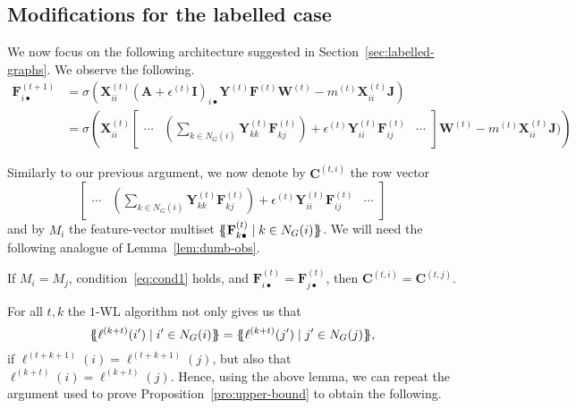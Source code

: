 \subsection{Modifications for the labelled case}
We now focus on the following architecture suggested
in Section~\ref{sec:labelled-graphs}. We observe the following.
\begin{align}
    \mathbf{F}^{(t+1)}_{i\bullet} &= \sigma(
        \mathbf{X}^{(t)}_{ii} (\mathbf{A} + \epsilon^{(t)}\mathbf{I})_{i\bullet}
        \mathbf{Y}^{(t)}\mathbf{F}^{(t)}\mathbf{W}^{(t)}
        -m^{(t)}\mathbf{X}_{ii}^{(t)}\mathbf{J})\\
    &= \sigma \left(
        \mathbf{X}^{(t)}_{ii}
        \begin{bmatrix}
        \cdots & \left(\sum_{k \in N_G(i)} \mathbf{Y}^{(t)}_{kk} \mathbf{F}^{(t)}_{k j}\right) + \epsilon^{(t)}\mathbf{Y}^{(t)}_{ii}\mathbf{F}^{(t)}_{ij} & \cdots
        \end{bmatrix}
        \mathbf{W}^{(t)}
        -m^{(t)}\mathbf{X}_{ii}^{(t)}\mathbf{J})
        \right)
\end{align}

Similarly to our previous argument, we now
denote by $\mathbf{C}^{(t,i)}$ the row vector 
\[
    \begin{bmatrix}
        \cdots & \left(\sum_{k \in N_G(i)} \mathbf{Y}^{(t)}_{kk} \mathbf{F}^{(t)}_{k j}\right) + \epsilon^{(t)}\mathbf{Y}^{(t)}_{ii}\mathbf{F}^{(t)}_{ij} & \cdots
    \end{bmatrix}
\]
and by $M_i$ the feature-vector multiset $\{\!\!\{ \mathbf{F}^{(t)}_{k\bullet} \mathrel{\mid} k \in N_G(i) \}\!\!\}$. We 
will need the following analogue of Lemma~\ref{lem:dumb-obs}.
\begin{lemma}
    If $M_i = M_{j}$,
    condition~\eqref{eq:cond1} holds, and $\mathbf{F}^{(t)}_{i\bullet} = \mathbf{F}^{(t)}_{j\bullet}$,
    then $\mathbf{C}^{(t,i)} = \mathbf{C}^{(t,j)}$.
\end{lemma}

For all $t,k$ the $1$-WL algorithm not only
gives us that
\[
    \ldbl \ell^{(k+t)}(i') \st i' \in N_G(i) \rdbl
    =
    \ldbl \ell^{(k+t)}(j') \st j' \in N_G(j) \rdbl,
\]
if $\ell^{(t+k+1)}(i)=\ell^{(t+k+1)}(j)$, but also that
$\ell^{(k+t)}(i) = \ell^{(k+t)}(j)$. Hence, using the above lemma, we can repeat the argument used to prove Proposition~\ref{pro:upper-bound} to obtain the following.


